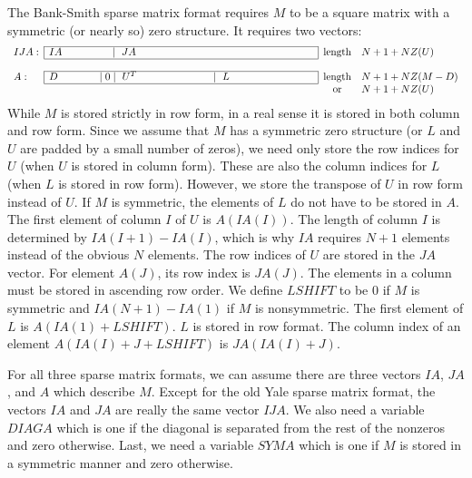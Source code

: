      The Bank-Smith sparse matrix format \cite{BankSmith87} requires $M$ to be a
square matrix with a symmetric (or nearly so) zero structure.  It
requires two vectors:
\[
\begin{array}{llcl}\cline{2-2}
IJA: & \multicolumn{1}{|l|}{IA\hspace{0.6in}~\mid~JA\hspace*{2.4in}}    
                              & {\rm length} & N+1+NZ(U)\\ \cline{2-2}
     &                        &              & \\ \cline{2-2}
A:   & \multicolumn{1}{|l|}{D\hspace{0.525in}\mid 0 
                            \mid~U^T\hspace*{1.0in}\mid~L\hspace*{1.0in}}
                              & {\rm length} & N+1+NZ(M-D)\\ \cline{2-2}
     &                        & {\rm or}     & N+1+NZ(U)
\end{array}
\]
While $M$ is stored strictly in row form, in a real sense it is
stored in both column and row form.  Since we assume that $M$ has a
symmetric zero structure (or $L$ and $U$ are padded by a small number
of zeros), we need only store the row indices for $U$ (when $U$ is
stored in column form).  These are also the column indices for $L$
(when $L$ is stored in row form).  However, we store the transpose
of $U$ in row form instead of $U$. If $M$ is symmetric, the elements of
$L$ do not have to be stored in $A$. The first element of column $I$ of
$U$ is $A(IA(I))$.  The length of column $I$ is determined by 
$IA(I+1)-IA(I)$, which is why $IA$ requires $N+1$ elements instead of the
obvious $N$ elements.  The row indices of $U$ are stored in the $JA$
vector.  For element $A(J)$, its row index is $JA(J)$.  The elements
in a column must be stored in ascending row order.  We define
$LSHIFT$ to be 0 if $M$ is symmetric and $IA(N+1)-IA(1)$ if $M$ is
nonsymmetric.  The first element of $L$ is $A(IA(1)+LSHIFT)$.  $L$ is
stored in row format.  The column index of an element
$A(IA(I)+J+LSHIFT)$ is $JA(IA(I)+J)$.
 
     For all three sparse matrix formats, we can assume there are
three vectors $IA$, $JA$, and $A$ which describe $M$.  Except for the old
Yale sparse matrix format, the vectors $IA$ and $JA$ are really the
same vector $IJA$.  We also need a variable $DIAGA$ which is one if
the diagonal is separated from the rest of the nonzeros and zero
otherwise.  Last, we need a variable $SYMA$ which is one if $M$ is
stored in a symmetric manner and zero otherwise.

